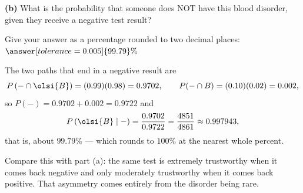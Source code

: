 \documentclass[12pt]{ximera}
\begin{document}
\begin{problem}
\begin{prompt}
\textbf{(b)} What is the probability that someone does NOT have this blood disorder,
given they receive a negative test result?

Give your answer as a percentage rounded to two decimal places:
$\answer[tolerance=0.005]{99.79}\%$

\begin{solution}
The two paths that end in a negative result are
\[
P\left(-\cap\olsi{B}\right)=(0.99)(0.98)=0.9702, \qquad
P(-\cap B)=(0.10)(0.02)=0.002,
\]
so $P(-)=0.9702+0.002=0.9722$ and
\[
P\left(\olsi{B}\mid -\right)=\frac{0.9702}{0.9722}=\frac{4851}{4861}\approx 0.997943,
\]
that is, about $99.79\%$ --- which rounds to $100\%$ at the nearest whole percent.

Compare this with part (a): the same test is extremely trustworthy when it comes
back negative and only moderately trustworthy when it comes back positive. That
asymmetry comes entirely from the disorder being rare.
\end{solution}
\end{prompt}
\end{problem}
\end{document}
